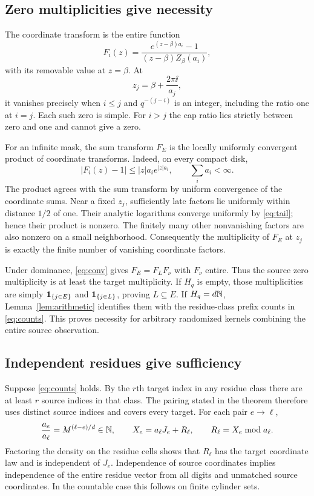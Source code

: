 \documentclass[11pt,a4paper]{article}
\theoremstyle{remark}\newtheorem*{ednote}{Editorial note (ProveIt, 2026-10-01)}
\begin{document}
\subsection{Zero multiplicities give necessity}
The coordinate transform is the entire function
\[
 F_i(z)=\frac{e^{(z-\beta)a_i}-1}{(z-\beta)Z_\beta(a_i)},
\]
with its removable value at $z=\beta$. At
\[
 z_j=\beta+\frac{2\pi\ii}{a_j},
\]
it vanishes precisely when $i\le j$ and $q^{-(j-i)}$ is an integer, including the ratio one at $i=j$. Each such zero is simple. For $i>j$ the cap ratio lies strictly between zero and one and cannot give a zero.

For an infinite mask, the sum transform $F_E$ is the locally uniformly convergent product of coordinate transforms. Indeed, on every compact disk,
\begin{equation}\label{eq:tail}
 |F_i(z)-1|\le |z|a_i e^{|z|a_i},
 \qquad \sum_i a_i<\infty.
\end{equation}
The product agrees with the sum transform by uniform convergence of the coordinate sums. Near a fixed $z_j$, sufficiently late factors lie uniformly within distance $1/2$ of one. Their analytic logarithms converge uniformly by \eqref{eq:tail}; hence their product is nonzero. The finitely many other nonvanishing factors are also nonzero on a small neighborhood. Consequently the multiplicity of $F_E$ at $z_j$ is exactly the finite number of vanishing coordinate factors.

Under dominance, \eqref{eq:conv} gives $F_E=F_LF_\nu$ with $F_\nu$ entire. Thus the source zero multiplicity is at least the target multiplicity. If $H_q$ is empty, those multiplicities are simply $\mathbf1_{\{j\in E\}}$ and $\mathbf1_{\{j\in L\}}$, proving $L\subseteq E$. If $H_q=d\mathbb N$, Lemma~\ref{lem:arithmetic} identifies them with the residue-class prefix counts in \eqref{eq:counts}. This proves necessity for arbitrary randomized kernels combining the entire source observation.

\subsection{Independent residues give sufficiency}
Suppose \eqref{eq:counts} holds. By the $r$th target index in any residue class there are at least $r$ source indices in that class. The pairing stated in the theorem therefore uses distinct source indices and covers every target. For each pair $e\to\ell$,
\[
 \frac{a_e}{a_\ell}=M^{(\ell-e)/d}\in\mathbb N,
 \qquad X_e=a_\ell J_e+R_\ell,
 \qquad R_\ell=X_e\bmod a_\ell.
\]
Factoring the density on the residue cells shows that $R_\ell$ has the target coordinate law and is independent of $J_e$. Independence of source coordinates implies independence of the entire residue vector from all digits and unmatched source coordinates. In the countable case this follows on finite cylinder sets.
\end{document}
